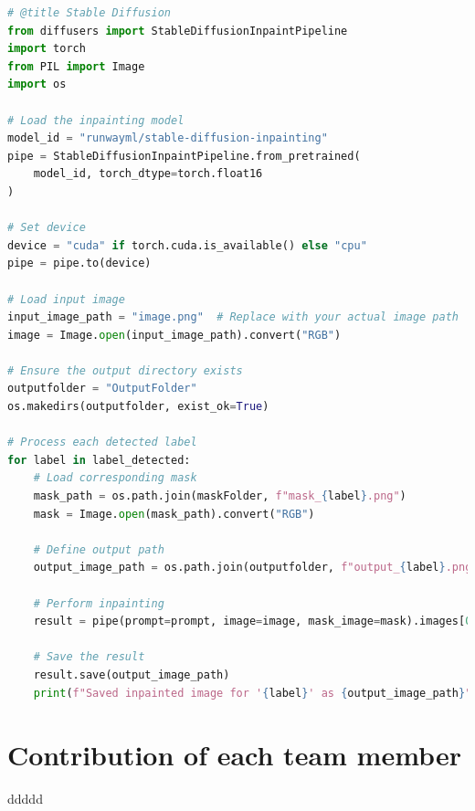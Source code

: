 \documentclass[11pt,letterpaper]{article}
\begin{document}
\begin{lstlisting}[language=Python, caption={Code for Noun extraction}, label={lst:mask_processing}]
# @title Stable Diffusion
from diffusers import StableDiffusionInpaintPipeline
import torch
from PIL import Image
import os

# Load the inpainting model
model_id = "runwayml/stable-diffusion-inpainting"
pipe = StableDiffusionInpaintPipeline.from_pretrained(
    model_id, torch_dtype=torch.float16
)

# Set device
device = "cuda" if torch.cuda.is_available() else "cpu"
pipe = pipe.to(device)

# Load input image
input_image_path = "image.png"  # Replace with your actual image path
image = Image.open(input_image_path).convert("RGB")

# Ensure the output directory exists
outputfolder = "OutputFolder"
os.makedirs(outputfolder, exist_ok=True)

# Process each detected label
for label in label_detected:
    # Load corresponding mask
    mask_path = os.path.join(maskFolder, f"mask_{label}.png")
    mask = Image.open(mask_path).convert("RGB")
    
    # Define output path
    output_image_path = os.path.join(outputfolder, f"output_{label}.png")
    
    # Perform inpainting
    result = pipe(prompt=prompt, image=image, mask_image=mask).images[0]
    
    # Save the result
    result.save(output_image_path)
    print(f"Saved inpainted image for '{label}' as {output_image_path}")
\end{lstlisting}





\section{Contribution of each team member}
ddddd

















\printbibliography
\end{document}
